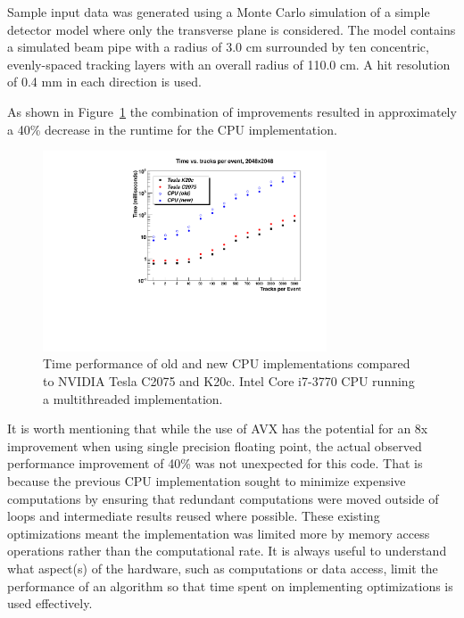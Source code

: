 \documentclass{JINST}
\begin{document}
Sample input data was generated using a Monte Carlo simulation of a simple detector model where only the transverse plane is considered.  The model contains a simulated beam pipe with a radius of 3.0 cm surrounded by ten concentric, evenly-spaced tracking layers with an overall radius of 110.0 cm.  A hit resolution of 0.4 mm in each direction is used.

As shown in Figure~\ref{fig:TimePerformance} the combination of improvements resulted in approximately a 40\% decrease in the runtime for the CPU implementation.

\begin{figure}[!Hhtb]
\begin{center}
\includegraphics[width=0.75\textwidth]{figs/TimePerformance.pdf} 
\caption{Time performance of old and new CPU implementations compared to NVIDIA Tesla C2075 and K20c. 
 Intel Core i7-3770 CPU running a multithreaded implementation.\label{fig:TimePerformance}}
\end{center}
\end{figure}

It is worth mentioning that while the use of AVX has the potential for an 8x improvement when using single precision floating point, the actual observed performance improvement of 40\% was not unexpected for this code.  That is because the previous CPU implementation sought to minimize expensive computations by ensuring that redundant computations were moved outside of loops and intermediate results reused where possible.  These existing optimizations meant the implementation was limited more by memory access operations rather than the computational rate.  It is always useful to understand what aspect(s) of the hardware, such as computations or data access, limit the performance of an algorithm so that time spent on implementing optimizations is used effectively.
\end{document}
